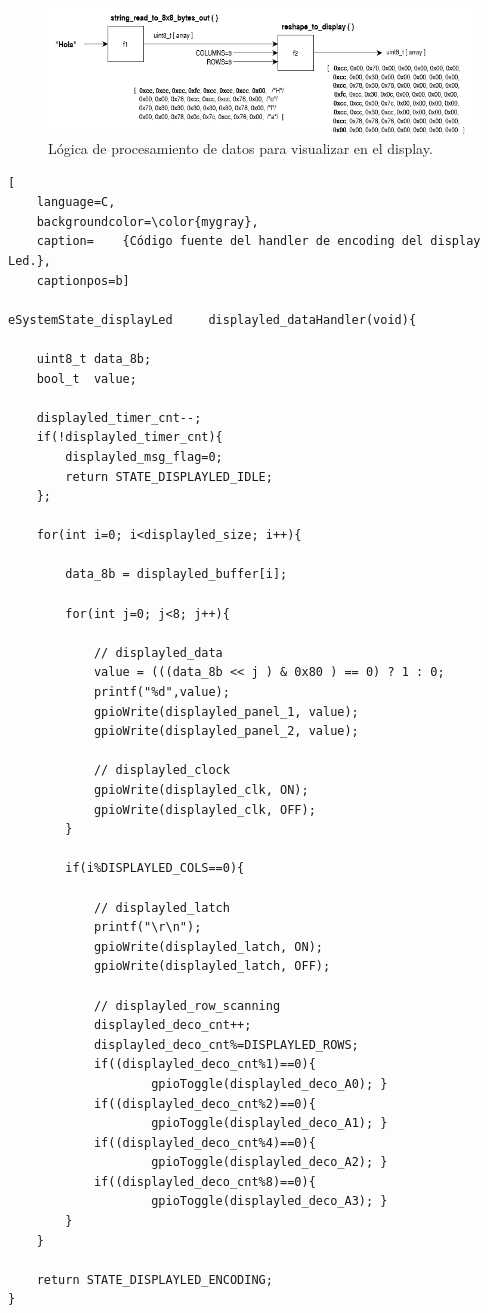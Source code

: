 \begin{figure}[ht]
	\centering
	\includegraphics[width=1\textwidth]{./Figures/pipelineDataEncoding.png}
	\caption{Lógica de procesamiento de datos para visualizar en el display.}
	\label{fig:displayDataLogic}
\end{figure}


\begin{lstlisting}[
	language=C, 
	backgroundcolor=\color{mygray},
	caption=	{Código fuente del handler de encoding del display Led.},
	captionpos=b]
	
eSystemState_displayLed     displayled_dataHandler(void){

    uint8_t data_8b;
    bool_t  value;

    displayled_timer_cnt--;
    if(!displayled_timer_cnt){
        displayled_msg_flag=0;
        return STATE_DISPLAYLED_IDLE;
    };    

    for(int i=0; i<displayled_size; i++){
        
        data_8b = displayled_buffer[i];
        
        for(int j=0; j<8; j++){
            
            // displayled_data 
            value = (((data_8b << j ) & 0x80 ) == 0) ? 1 : 0;
            printf("%d",value);
            gpioWrite(displayled_panel_1, value);
            gpioWrite(displayled_panel_2, value);
            
            // displayled_clock 
            gpioWrite(displayled_clk, ON);
            gpioWrite(displayled_clk, OFF);
        }
        
        if(i%DISPLAYLED_COLS==0){

            // displayled_latch 
            printf("\r\n");
            gpioWrite(displayled_latch, ON);
            gpioWrite(displayled_latch, OFF);
            
            // displayled_row_scanning
            displayled_deco_cnt++;
            displayled_deco_cnt%=DISPLAYLED_ROWS;
            if((displayled_deco_cnt%1)==0){ 
            		gpioToggle(displayled_deco_A0); }
            if((displayled_deco_cnt%2)==0){ 
            		gpioToggle(displayled_deco_A1); }
            if((displayled_deco_cnt%4)==0){ 
            		gpioToggle(displayled_deco_A2); }
            if((displayled_deco_cnt%8)==0){ 
            		gpioToggle(displayled_deco_A3); }
        }
    }
    
    return STATE_DISPLAYLED_ENCODING;
}

\end{lstlisting}
